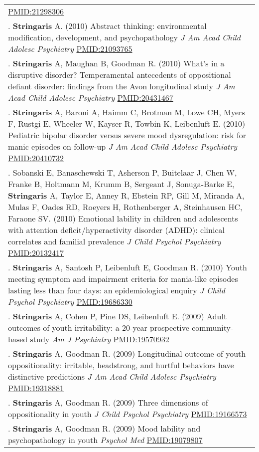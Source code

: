 \documentclass[
]{article}
\begin{document}
\begin{longtable}[]{@{}
  >{\raggedright\arraybackslash}p{}@{}}
\url{PMID:21298306} \\
185. \textbf{Stringaris} A. (2010) Abstract thinking: environmental
modification, development, and psychopathology \emph{J Am Acad Child
Adolesc Psychiatry} \url{PMID:21093765} \\
186. \textbf{Stringaris} A, Maughan B, Goodman R. (2010) What's in a
disruptive disorder? Temperamental antecedents of oppositional defiant
disorder: findings from the Avon longitudinal study \emph{J Am Acad
Child Adolesc Psychiatry} \url{PMID:20431467} \\
187. \textbf{Stringaris} A, Baroni A, Haimm C, Brotman M, Lowe CH, Myers
F, Rustgi E, Wheeler W, Kayser R, Towbin K, Leibenluft E. (2010)
Pediatric bipolar disorder versus severe mood dysregulation: risk for
manic episodes on follow-up \emph{J Am Acad Child Adolesc Psychiatry}
\url{PMID:20410732} \\
188. Sobanski E, Banaschewski T, Asherson P, Buitelaar J, Chen W, Franke
B, Holtmann M, Krumm B, Sergeant J, Sonuga-Barke E, \textbf{Stringaris}
A, Taylor E, Anney R, Ebstein RP, Gill M, Miranda A, Mulas F, Oades RD,
Roeyers H, Rothenberger A, Steinhausen HC, Faraone SV. (2010) Emotional
lability in children and adolescents with attention
deficit/hyperactivity disorder (ADHD): clinical correlates and familial
prevalence \emph{J Child Psychol Psychiatry} \url{PMID:20132417} \\
189. \textbf{Stringaris} A, Santosh P, Leibenluft E, Goodman R. (2010)
Youth meeting symptom and impairment criteria for mania-like episodes
lasting less than four days: an epidemiological enquiry \emph{J Child
Psychol Psychiatry} \url{PMID:19686330} \\
190. \textbf{Stringaris} A, Cohen P, Pine DS, Leibenluft E. (2009) Adult
outcomes of youth irritability: a 20-year prospective community-based
study \emph{Am J Psychiatry} \url{PMID:19570932} \\
191. \textbf{Stringaris} A, Goodman R. (2009) Longitudinal outcome of
youth oppositionality: irritable, headstrong, and hurtful behaviors have
distinctive predictions \emph{J Am Acad Child Adolesc Psychiatry}
\url{PMID:19318881} \\
192. \textbf{Stringaris} A, Goodman R. (2009) Three dimensions of
oppositionality in youth \emph{J Child Psychol Psychiatry}
\url{PMID:19166573} \\
193. \textbf{Stringaris} A, Goodman R. (2009) Mood lability and
psychopathology in youth \emph{Psychol Med} \url{PMID:19079807} \\

\end{longtable}
\end{document}
